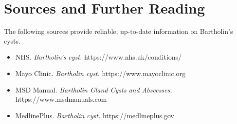 \section*{Sources and Further Reading}
The following sources provide reliable, up-to-date information on Bartholin's cysts.
\begin{itemize}
    \item NHS. \textit{Bartholin's cyst.} https://www.nhs.uk/conditions/
    \item Mayo Clinic. \textit{Bartholin cyst.} https://www.mayoclinic.org
    \item MSD Manual. \textit{Bartholin Gland Cysts and Abscesses.} https://www.msdmanuals.com
    \item MedlinePlus. \textit{Bartholin cyst.} https://medlineplus.gov
\end{itemize}
